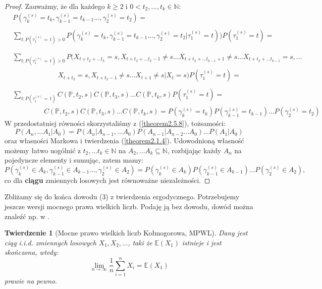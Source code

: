 \documentclass[a4paper]{article}
\theoremstyle{defn}
\theoremstyle{theorem}
\newtheorem{theorem}[defn]{Twierdzenie}
\theoremstyle{lemma}
\theoremstyle{cor}
\theoremstyle{fact}
\begin{document}
\begin{proof}
Zauważmy, że dla każdego $k \geq 2$ i $0 < t_2,...,t_k \in \mathbb{N}$:
\begin{align*}
    &P(\gamma_k^{(s)} = t_k, \gamma_{k-1}^{(s)} = t_{k-1} ..., \gamma_2^{(s)} = t_2) =\\\\
    &\sum\limits_{t: P(\tau_1^{(s)} =\, t) > 0} P(\gamma_k^{(s)} =t_k, \gamma_{k-1}^{(s)} = t_{k-1} ..., \gamma_2^{(s)} = t_2 | \tau_1^{(s)} = t))P(\tau_1^{(s)} = t) =\\\\
    \end{align*}
    \begin{align*}
    &\sum\limits_{t: P(\tau_1^{(s)} =\, t) > 0} P(X_{t+t_2+...t_k} = s, X_{t+t_2+...t_k - 1} \neq s ... X_{t+t_2+...t_{k-1} + 1} \neq s ... X_{t+t_2+...t_{k-1}} = s, ...\\
    &\quad\quad\quad\quad\quad\quad\,\,\, X_{t+t_2} = s, X_{t+t_2 - 1} \neq s ... X_{t+1} \neq s|X_t = s)P(\tau_1^{(s)} = t) = \\\\
    &\sum\limits_{t: P(\tau_1^{(s)} = \, t)} C(\mathbb{P}, t_2, s)C(\mathbb{P}, t_3, s)...C(\mathbb{P}, t_k, s)P(\tau_1^{(s)} = t) =\\
    &\quad\quad\quad\quad\,\,\, C(\mathbb{P}, t_2, s)C(\mathbb{P}, t_3, s)...C(\mathbb{P}, t_k, s) = P(\gamma_k^{(s)} = t_k) P(\gamma_{k-1}^{(s)} = t_{k-1}) ...P(\gamma_2^{(s)} = t_2)
\end{align*}
W przedostatniej równości skorzystaliśmy z (\ref{theorem2.5.8}), tożsamości:
$$P(A_n, ... A_1|A_0) = P(A_n|A_{n-1}, ...A_0)P(A_{n-1}|A_{n-2}...A_0)...P(A_1|A_0)$$
oraz własności Markowa i twierdzenia (\ref{theorem2.1.4}). Udowodnioną własność możemy łatwo uogólnić z $t_2, ... t_k \in \mathbb{N}$ na $A_2, ... A_k \subseteq \mathbb{N}$, rozbijając każdy $A_n$ na pojedyncze elementy i sumując, zatem mamy:
$$P(\gamma_k^{(s)} \in A_k, \gamma_{k-1}^{(s)} \in A_{k-1} ..., \gamma_2^{(s)} \in A_2) = P(\gamma_k^{(s)} \in A_k) P(\gamma_{k-1}^{(s)} \in A_{k-1}) ...P(\gamma_2^{(s)} \in A_{2}),$$
co dla \textbf{ciągu} zmiennych losowych jest równoważne niezależności.
\end{proof}
Zbliżamy się do końca dowodu (3) z twierdzenia ergodycznego. Potrzebujemy jeszcze wersji mocnego prawa wielkich liczb. Podaję ją bez dowodu, dowód można znaleźć np. w \cite{sztencel}.
\begin{theorem}[Mocne prawo wielkich liczb Kołmogorowa, MPWL]\label{theorem2.5.10}
Dany jest ciąg i.i.d. zmiennych losowych $X_1, X_2, ... $, taki że $\mathbb{E}(X_1)$ istnieje i jest skończona, wtedy:
$$ \lim\limits_{n \to \infty} \frac{1}{n}\sum\limits_{i=1}^n X_i = \mathbb{E}(X_1)$$
prawie na pewno.
\end{theorem}
\end{document}
